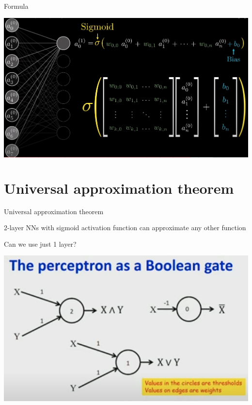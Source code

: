 \documentclass[aspectratio=169,xcolor=dvipsnames]{beamer}
\begin{document}
\begin{frame}{Formula}
    \begin{center}
        \includegraphics[width=1.5\textheight]{../images/formula.png}
    \end{center}
\end{frame}


\section{Universal approximation theorem}
\begin{frame}{Universal approximation theorem}
    \begin{theorem}
       2-layer NNs with sigmoid activation function can approximate any other function
    \end{theorem}
\end{frame}

\begin{frame}{Can we use just 1 layer?}
    \begin{center}
        \includegraphics[width=1.3\textheight]{../images/perceptron_as_a_boolean_gate.png}
    \end{center}
\end{frame}
\end{document}
